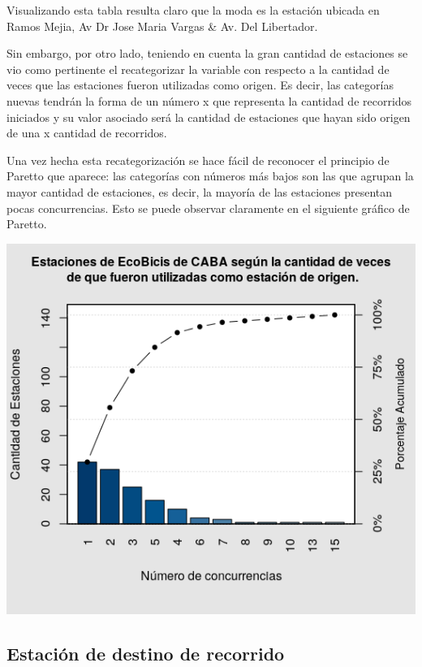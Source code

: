 \documentclass[11pt]{article}
\begin{document}
    Visualizando esta tabla resulta claro que la moda es la estaci\'on ubicada en Ramos Mejia, Av Dr Jose Maria Vargas \& Av. Del Libertador. 

    Sin embargo, por otro lado, teniendo en cuenta la gran cantidad de estaciones se vio como pertinente el recategorizar la variable 
    con respecto a la cantidad de veces que las estaciones fueron utilizadas como origen. Es decir, las categor\'ias nuevas tendr\'an 
    la forma de un n\'umero x que representa la cantidad de recorridos iniciados y su valor asociado ser\'a la cantidad de estaciones 
    que hayan sido origen de una x cantidad de recorridos. 

    Una vez hecha esta recategorizaci\'on se hace f\'acil de reconocer el principio de Paretto que aparece: las categor\'ias con n\'umeros m\'as bajos son las que 
    agrupan la mayor cantidad de estaciones, es decir, la mayor\'ia de las estaciones presentan pocas concurrencias. Esto se puede observar claramente en el siguiente gr\'afico de Paretto. 

    \begin{center}
    \includegraphics[scale=0.7]{ParettoOrigen.png}
    \end{center}


    \subsection{Estaci\'on de destino de recorrido}
\end{document}
